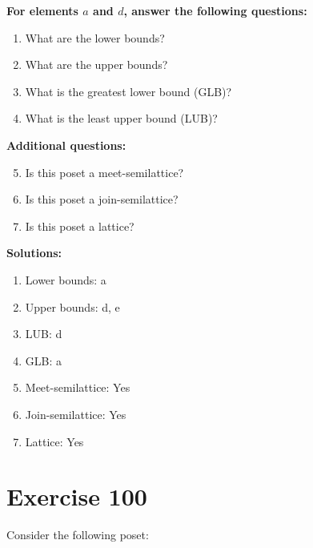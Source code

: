 \documentclass{article}
\begin{document}
    \textbf{For elements $a$ and $d$, answer the following questions:}
\begin{enumerate}
    \item What are the lower bounds?
    \item What are the upper bounds?
    \item What is the greatest lower bound (GLB)?
    \item What is the least upper bound (LUB)?
\end{enumerate}
    \hspace*{3ex} \textbf{Additional questions:}
\begin{enumerate}
    \setcounter{enumi}{4}
    \item Is this poset a meet-semilattice?
    \item Is this poset a join-semilattice?
    \item Is this poset a lattice?
\end{enumerate}

\textbf{Solutions:}
\begin{enumerate}
    \item Lower bounds: {a}
    \item Upper bounds: {d, e}
    \item LUB: d
    \item GLB: a
    \item Meet-semilattice: Yes
    \item Join-semilattice: Yes
    \item Lattice: Yes
\end{enumerate}
\newpage
\section*{Exercise 100}
Consider the following poset:
\begin{center}
\end{center}
\end{document}
